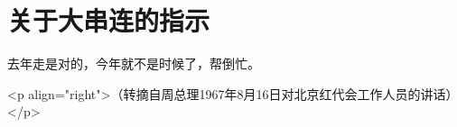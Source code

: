 \section[关于大串连的指示（一九六七年八月）]{关于大串连的指示}


去年走是对的，今年就不是时候了，帮倒忙。

<p align="right">（转摘自周总理1967年8月16日对北京红代会工作人员的讲话）</p>


